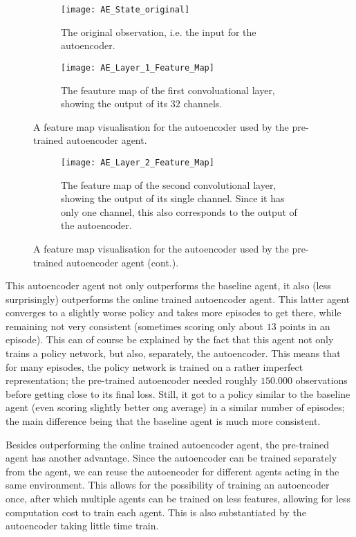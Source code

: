 \begin{figure}[h]
	\centering
	\begin{subfigure}[b]{1\textwidth}
		\texttt{[image: AE\_State\_original]}
		\caption{The original observation, i.e. the input for the autoencoder.}
		\label{fig:ae-featuremap-original} 
	\end{subfigure}
	\begin{subfigure}[b]{1\textwidth}
		\texttt{[image: AE\_Layer\_1\_Feature\_Map]}
		\caption{The feauture map of the first convoluational layer, showing the output of its $32$ channels.}
		\label{fig:ae-featuremap-layer1}
	\end{subfigure}
	\caption{A feature map visualisation for the autoencoder used by the pre-trained autoencoder agent.}
\end{figure}%
\begin{figure}[ht]\ContinuedFloat
	\begin{subfigure}[b]{1\textwidth}
		\texttt{[image: AE\_Layer\_2\_Feature\_Map]}
		\caption{The feature map of the second convolutional layer, showing the output of its single channel. Since it has only one channel, this also corresponds to the output of the autoencoder.}
		\label{fig:ae-featuremap-layer2}
	\end{subfigure}
	\caption{A feature map visualisation for the autoencoder used by the pre-trained autoencoder agent (cont.).}
	\label{fig:ae-featuremap}
\end{figure}

This autoencoder agent not only outperforms the baseline agent, it also (less surprisingly) outperforms the online trained autoencoder agent. This latter agent converges to a slightly worse policy and takes more episodes to get there, while remaining not very consistent (sometimes scoring only about $13$ points in an episode). This can of course be explained by the fact that this agent not only trains a policy network, but also, separately, the autoencoder. This means that for many episodes, the policy network is trained on a rather imperfect representation; the pre-trained autoencoder needed roughly $150.000$ observations before getting close to its final loss. Still, it got to a policy similar to the baseline agent (even scoring slightly better ong average) in a similar number of episodes; the main difference being that the baseline agent is much more consistent. %

Besides outperforming the online trained autoencoder agent, the pre-trained agent has another advantage. Since the autoencoder can be trained separately from the agent, we can reuse the autoencoder for different agents acting in the same environment. This allows for the possibility of training an autoencoder once, after which multiple agents can be trained on less features, allowing for less computation cost to train each agent. This is also substantiated by the autoencoder taking little time train.

